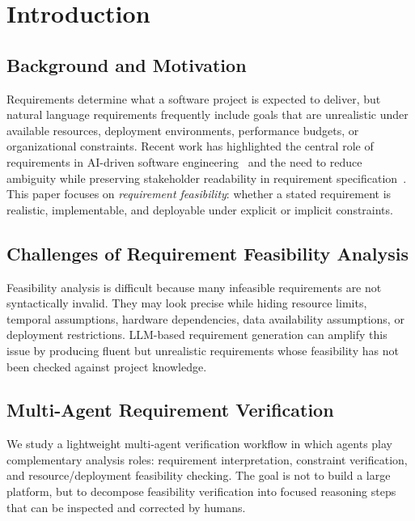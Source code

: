 \section{Introduction}
\label{introduction}

\subsection{Background and Motivation}
\label{intro:background}

Requirements determine what a software project is expected to deliver, but natural language requirements frequently include goals that are unrealistic under available resources, deployment environments, performance budgets, or organizational constraints.
Recent work has highlighted the central role of requirements in AI-driven software engineering~\cite{robinsonRequirementsAreAll2025} and the need to reduce ambiguity while preserving stakeholder readability in requirement specification~\cite{darifControlledNaturalLanguage2026}.
This paper focuses on \emph{requirement feasibility}: whether a stated requirement is realistic, implementable, and deployable under explicit or implicit constraints.

\subsection{Challenges of Requirement Feasibility Analysis}
\label{intro:challenges}

Feasibility analysis is difficult because many infeasible requirements are not syntactically invalid.
They may look precise while hiding resource limits, temporal assumptions, hardware dependencies, data availability assumptions, or deployment restrictions.
LLM-based requirement generation can amplify this issue by producing fluent but unrealistic requirements whose feasibility has not been checked against project knowledge.

\subsection{Multi-Agent Requirement Verification}
\label{intro:multi_agent}

We study a lightweight multi-agent verification workflow in which agents play complementary analysis roles: requirement interpretation, constraint verification, and resource/deployment feasibility checking.
The goal is not to build a large platform, but to decompose feasibility verification into focused reasoning steps that can be inspected and corrected by humans.

